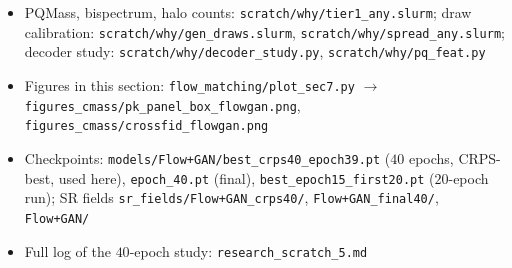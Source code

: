 \begin{itemize}
  (\texttt{make\_lowk\_guided}), \texttt{sample\_fm.py --lowk-guide 0.02,0.05}
  \item PQMass, bispectrum, halo counts: \texttt{scratch/why/tier1\_any.slurm};
  draw calibration: \texttt{scratch/why/gen\_draws.slurm}, \texttt{scratch/why/spread\_any.slurm};
  decoder study: \texttt{scratch/why/decoder\_study.py}, \texttt{scratch/why/pq\_feat.py}
  \item Figures in this section: \texttt{flow\_matching/plot\_sec7.py}
  $\to$ \texttt{figures\_cmass/pk\_panel\_box\_flowgan.png},
  \texttt{figures\_cmass/crossfid\_flowgan.png}
  \item Checkpoints: \texttt{models/Flow+GAN/best\_crps40\_epoch39.pt} ($40$ epochs,
  CRPS-best, used here), \texttt{epoch\_40.pt} (final),
  \texttt{best\_epoch15\_first20.pt} ($20$-epoch run); SR fields
  \texttt{sr\_fields/Flow+GAN\_crps40/}, \texttt{Flow+GAN\_final40/}, \texttt{Flow+GAN/}
  \item Full log of the $40$-epoch study: \texttt{research\_scratch\_5.md}
\end{itemize}
